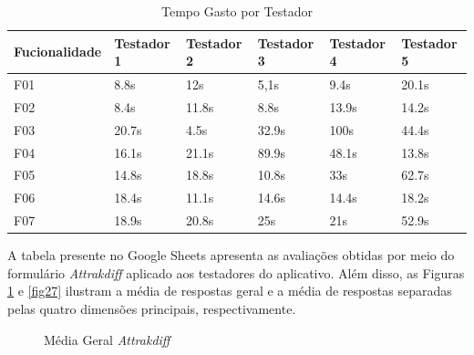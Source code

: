 \begin{table}[h!]
	\centering
	\caption{Tempo Gasto por Testador}
	\label{tab05}
	\begin{tabular}{l|l|l|l|l|l}
	\hline
	Fucionalidade & Testador 1 & Testador 2 & Testador 3 & Testador 4 & Testador 5 \\ 	\hline
	F01                   & 8.8s     & 12s     & 5,1s      & 9.4s       & 20.1s      \\
	F02                   & 8.4s        & 11.8s      & 8.8s      & 13.9s    & 14.2s     \\
	F03                   & 20.7s        & 4.5s      & 32.9s      & 100s     & 44.4s     \\
	F04                   & 16.1s        & 21.1s     & 89.9s     & 48.1s     & 13.8s     \\
	F05                   & 14.8s      & 18.8s      & 10.8s     & 33s     & 62.7s     \\
	F06                   & 18.4s     & 11.1s      & 14.6s     & 14.4s     & 18.2s     \\
	F07                   & 18.9s     & 20.8s      & 25s     & 21s    & 52.9s       \\ 	\hline
	\end{tabular}
\end{table}

A tabela presente no Google Sheets apresenta as avaliações obtidas por meio do formulário \textit{Attrakdiff} aplicado aos testadores do aplicativo. Além disso, as Figuras \ref{fig26} e \ref{fig27} ilustram a média de respostas geral e a média 
de respostas separadas pelas quatro dimensões principais, respectivamente.

\begin{figure}[h!]
	\centering
	\caption{Média Geral \textit{Attrakdiff}}
	\label{fig26}
\end{figure}

